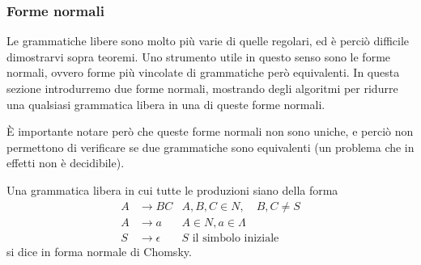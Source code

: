 \documentclass[12pt]{article}
\numberwithin{theorem}{subsection}
\begin{document}
\subsubsection{Forme normali}
Le grammatiche libere sono molto più varie di quelle regolari, ed è perciò difficile dimostrarvi sopra teoremi. Uno strumento utile in questo senso sono le forme normali, ovvero forme più vincolate di grammatiche però equivalenti. In questa sezione introdurremo due forme normali, mostrando degli algoritmi per ridurre una qualsiasi grammatica libera in una di queste forme normali.

È importante notare però che queste forme normali non sono uniche, e perciò non permettono di verificare se due grammatiche sono equivalenti (un problema che in effetti non è decidibile).

\begin{definition}
	Una grammatica libera in cui tutte le produzioni siano della forma
	\begin{align*}
	A &\rightarrow BC  &A, B, C \in N, \quad B, C \neq S \\
	A &\rightarrow a   &A \in N, a \in \Lambda \\
	S &\rightarrow \epsilon   &S \text{ il simbolo iniziale}
	\end{align*}
	si dice in forma normale di Chomsky.
\end{definition}
\end{document}
